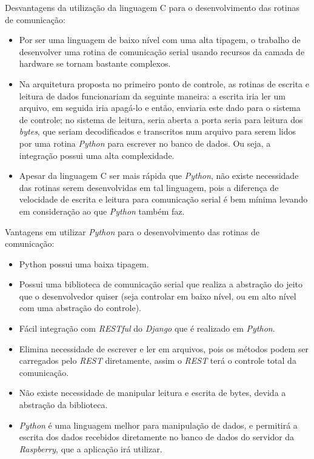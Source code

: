 Desvantagens da utilização da linguagem C para o desenvolvimento das rotinas de comunicação:

\begin{itemize}
    \item Por ser uma linguagem de baixo nível com uma alta tipagem, o trabalho de desenvolver uma rotina de comunicação serial usando recursos da camada de hardware se tornam bastante complexos.
    \item Na arquitetura proposta no primeiro ponto de controle, as rotinas de escrita e leitura de dados funcionariam da seguinte maneira: a escrita iria ler um arquivo, em seguida iria apagá-lo e então, enviaria este dado para o sistema de controle; no sistema de leitura, seria aberta a porta seria para leitura dos \textit{bytes}, que seriam decodificados e transcritos num arquivo para serem lidos por uma rotina \textit{Python} para escrever no banco de dados. Ou seja, a integração possui uma alta complexidade.
    \item Apesar da linguagem C ser mais rápida que \textit{Python}, não existe necessidade das rotinas serem desenvolvidas em tal linguagem, pois a diferença de velocidade de escrita e leitura para comunicação serial é bem mínima levando em consideração ao que \textit{Python} também faz.
\end{itemize}

Vantagens em utilizar \textit{Python} para o desenvolvimento das rotinas de comunicação:

\begin{itemize}
    \item Python possui uma baixa tipagem.
    \item Possui uma biblioteca de comunicação serial que realiza a abstração do jeito que o desenvolvedor quiser (seja controlar em baixo nível, ou em alto nível com uma abstração do controle).
    \item Fácil integração com \textit{RESTful} do \textit{Django} que é realizado em \textit{Python}.
    \item Elimina necessidade de escrever e ler em arquivos, pois os métodos podem ser carregados pelo \textit{REST} diretamente, assim o \textit{REST} terá o controle total da comunicação.
    \item Não existe necessidade de manipular leitura e escrita de bytes, devida a abstração da biblioteca.
    \item \textit{Python} é uma linguagem melhor para manipulação de dados, e permitirá a escrita dos dados recebidos diretamente no banco de dados do servidor da \textit{Raspberry}, que a aplicação irá utilizar.
\end{itemize}

